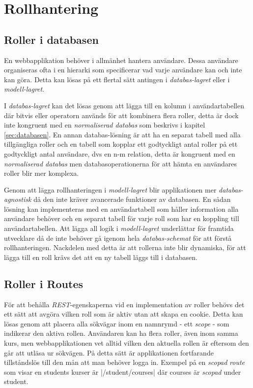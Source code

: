 \section{Rollhantering}

\subsection{Roller i databasen}

En webbapplikation behöver i allmänhet hantera användare. Dessa användare organiseras ofta i en hierarki som specificerar vad varje användare kan och inte kan göra. Detta kan lösas på ett flertal sätt antingen i \emph{databas-lagret} eller i \emph{modell-lagret}.

I \emph{databas-lagret} kan det lösas genom att lägga till en kolumn i användartabellen där bitvis eller 
operatorn används för att kombinera flera roller, detta är dock inte kongruent med en \emph{normaliserad databas} som beskrivs i kapitel \ref{sec:databasen}. En annan databas-lösning är att ha en separat tabell med alla tillgängliga roller och en tabell som kopplar ett godtyckligt antal roller på ett godtyckligt antal användare, dvs en n-m relation, detta är kongruent med en \emph{normaliserad databas} men databasoperationerna för att hämta en användares roller blir mer komplexa.

Genom att lägga rollhanteringen i \emph{modell-lagret} blir applikationen mer \emph{databas-agnostisk} då den inte kräver avancerade funktioner av databasen. En sådan lösning kan implementeras med en användartabell som håller information alla användare behöver och en separat tabell för varje roll som har en koppling till användartabellen. Att lägga all logik i \emph{modell-lagret} underlättar för framtida utvecklare då de inte behöver gå igenom hela \emph{databas-schemat} för att förstå rollhanteringen. Nackdelen med detta är att rollerna inte blir dynamiska, för att lägga till en roll krävs det att en ny tabell läggs till i databasen.

\subsection{Roller i Routes}

För att behålla \emph{REST}-egenskaperna vid en implementation av roller behövs det ett sätt att avgöra vilken roll som är aktiv utan att skapa en cookie. Detta kan lösas genom att placera alla sökvägar inom en namnrymd - ett \emph{scope} - som indikerar den aktiva rollen. Användaren kan ha flera roller, även inom samma kurs, men webbapplikationen vet alltid vilken den aktuella rollen är eftersom den går att utläsa ur sökvägen. På detta sätt är applikationen fortfarande tillståndslös till den mån att man behöver logga in.
Exempel på en \emph{scopad} \emph{route} som visar en students kurser är |/student/courses| där courses är \emph{scopad} under student.

